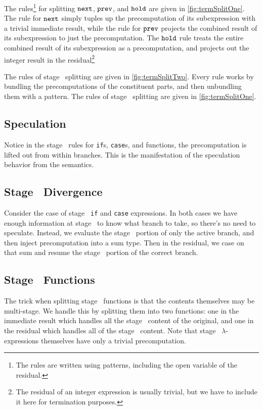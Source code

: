 The rules\footnote{The rules are written using patterns, including the open variable of the residual.} 
for splitting ${\tt next}$, ${\tt prev}$, and ${\tt hold}$ are given in \ref{fig:termSplitOne}.
The rule for ${\tt next}$ simply tuples up the precomputation of its subexpression with a trivial immediate result,
while the rule for ${\tt prev}$ projects the combined result of its subexpression to just the precomputation.
The ${\tt hold}$ rule treats the entire combined result of its subexpression as a precomputation, 
and projects out the integer result in the residual\footnote{The residual of an integer expression is usually trivial, 
but we have to include it here for termination purposes.}

The rules of stage \bbtwo\ splitting are given in \ref{fig:termSplitTwo}.  
Every rule works by bundling the precomputations of the constituent parts, and then unbundling them with a pattern.
The rules of stage \bbone\ splitting are given in \ref{fig:termSplitOne}.  


\subsection {Speculation}

Notice in the stage \bbtwo\ rules for {\tt if}s, {\tt case}s, and functions, the precomputation is lifted out from within branches.
This is the manifestation of the speculation behavior from the semantics.

\subsection {Stage \bbone\ Divergence}
Consider the case of stage \bbone\ {\tt if} and {\tt case} expressions.
In both cases we have enough information at stage \bbone\ to know what branch to take, so there's no need to speculate.
Instead, we evaluate the stage \bbone\ portion of only the active branch, and then inject precomputation into a sum type.
Then in the residual, we case on that sum and resume the stage \bbtwo\ portion of the correct branch.

\subsection {Stage \bbone\ Functions}

The trick when splitting stage \bbone\ functions is that the contents themselves may be multi-stage.
We handle this by splitting them into two functions:
one in the immediate result which handles all the stage \bbone\ content of the original,
and one in the residual which handles all of the stage \bbtwo\ content.
Note that stage \bbone\ $\lambda$-expressions themselves have only a trivial precomputation.


